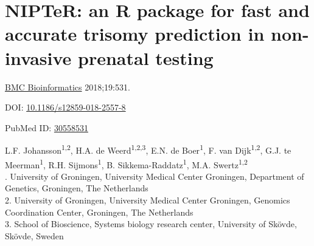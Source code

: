 \chapter[NIPTeR: an R package for NIPT analysis]{NIPTeR: an R package for fast and accurate trisomy prediction in non-invasive prenatal testing}
\label{chap:NIPTeR}

{ \Large {} }

\hfill \underline{BMC Bioinformatics} 2018;19:531.

\hfill DOI: \href{https://doi.org/10.1186/s12859-018-2557-8}{10.1186/s12859-018-2557-8}

\hfill PubMed ID: \href{https://www.ncbi.nlm.nih.gov/pubmed/30558531}{30558531}

\newpage

\noindent
L.F. Johansson\textsuperscript{1,2}, H.A. de Weerd\textsuperscript{1,2,3}, E.N. de Boer\textsuperscript{1}, F. van Dijk\textsuperscript{1,2}, G.J. te Meerman\textsuperscript{1}, R.H. Sijmons\textsuperscript{1}, B. Sikkema-Raddatz\textsuperscript{1}, M.A. Swertz\textsuperscript{1,2}\\

. University of Groningen, University Medical Center Groningen, Department of Genetics, Groningen, The Netherlands\\
2. University of Groningen, University Medical Center Groningen, Genomics Coordination Center, Groningen, The Netherlands\\
3. School of Bioscience, Systems biology research center, University of Skövde, Skövde, Sweden\\

